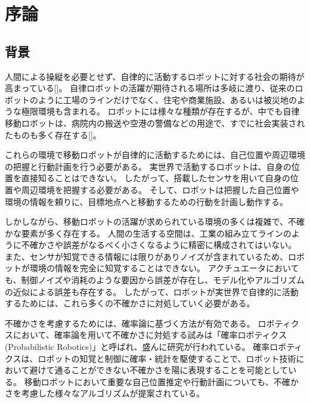 \chapter{序論} \label{chapter:introduction}


\section{背景} \label{section:backglound}

人間による操縦を必要とせず、自律的に活動するロボットに対する社会の期待が高まっている[]。
自律ロボットの活躍が期待される場所は多岐に渡り、従来のロボットのように工場のラインだけでなく、住宅や商業施設、あるいは被災地のような極限環境も含まれる。
ロボットには様々な種類が存在するが、中でも自律移動ロボットは、病院内の搬送や空港の警備などの用途で、すでに社会実装されたものも多く存在する[]。

これらの環境で移動ロボットが自律的に活動するためには、自己位置や周辺環境の把握と行動計画を行う必要がある。
実世界で活動するロボットは、自身の位置を直接知ることはできない。 %
したがって、搭載したセンサを用いて自身の位置や周辺環境を把握する必要がある。
そして、ロボットは把握した自己位置や環境の情報を頼りに、目標地点へと移動するための行動を計画し動作する。

しかしながら、移動ロボットの活躍が求められている環境の多くは複雑で、不確かな要素が多く存在する。
人間の生活する空間は、工業の組み立てラインのように不確かさや誤差がなるべく小さくなるように精密に構成されてはいない。
また、センサが知覚できる情報には限りがありノイズが含まれているため、ロボットが環境の情報を完全に知覚することはできない。
アクチュエータにおいても、制御ノイズや消耗のような要因から誤差が存在し、モデル化やアルゴリズムの近似による誤差も存在する。
したがって、ロボットが実世界で自律的に活動するためには、これら多くの不確かさに対処していく必要がある。

不確かさを考慮するためには、確率論に基づく方法が有効である。
ロボティクスにおいて、確率論を用いて不確かさに対処する試みは「確率ロボティクス(Probabilistic Robotics)」と呼ばれ、盛んに研究が行われている\cite{thrun2005,上田2007prob}。
確率ロボティクスは、ロボットの知覚と制御に確率・統計を駆使することで、ロボット技術において避けて通ることができない不確かさを陽に表現することを可能としている。
移動ロボットにおいて重要な自己位置推定や行動計画についても、不確かさを考慮した様々なアルゴリズムが提案されている。

